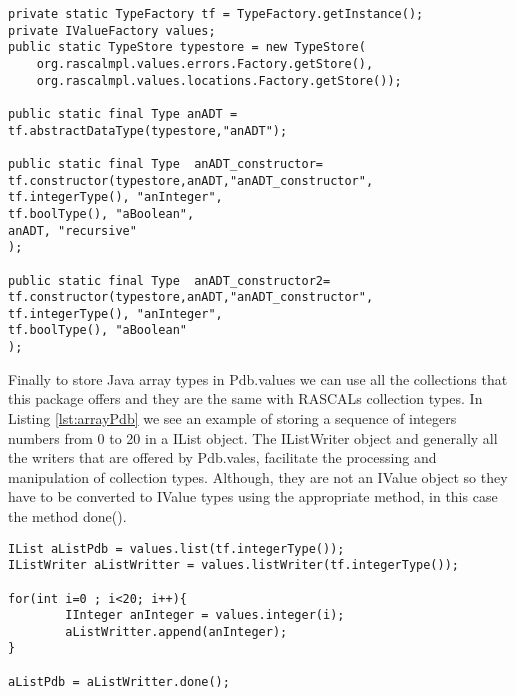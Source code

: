 \begin{lstlisting}[label=lst:consPdb,caption=Defining an ADT in Pdb.values package.]
private static TypeFactory tf = TypeFactory.getInstance();
private IValueFactory values;
public static TypeStore typestore = new TypeStore(
    org.rascalmpl.values.errors.Factory.getStore(), 
    org.rascalmpl.values.locations.Factory.getStore());
	  
public static final Type anADT = tf.abstractDataType(typestore,"anADT");

public static final Type  anADT_constructor=
tf.constructor(typestore,anADT,"anADT_constructor",
tf.integerType(), "anInteger",
tf.boolType(), "aBoolean",
anADT, "recursive"
);

public static final Type  anADT_constructor2=
tf.constructor(typestore,anADT,"anADT_constructor",
tf.integerType(), "anInteger",
tf.boolType(), "aBoolean"
);
\end{lstlisting}

Finally to store Java array types in Pdb.values we can use all the collections that this package offers and they are the same with RASCALs collection types. In Listing \ref{lst:arrayPdb} we see an example of storing a sequence of integers numbers from 0 to 20 in a IList object. The IListWriter object and generally all the writers that are offered by Pdb.vales, facilitate the processing and manipulation of collection types. Although, they are not an IValue object so they have to be converted to IValue types using the appropriate method, in this case the method done().

\begin{lstlisting}[label=lst:arrayPdb,caption=An array type declaration using Pdb.values.]
IList aListPdb = values.list(tf.integerType());
IListWriter aListWritter = values.listWriter(tf.integerType());
	
for(int i=0 ; i<20; i++){
		IInteger anInteger = values.integer(i);
		aListWritter.append(anInteger);
}

aListPdb = aListWritter.done();
\end{lstlisting}






